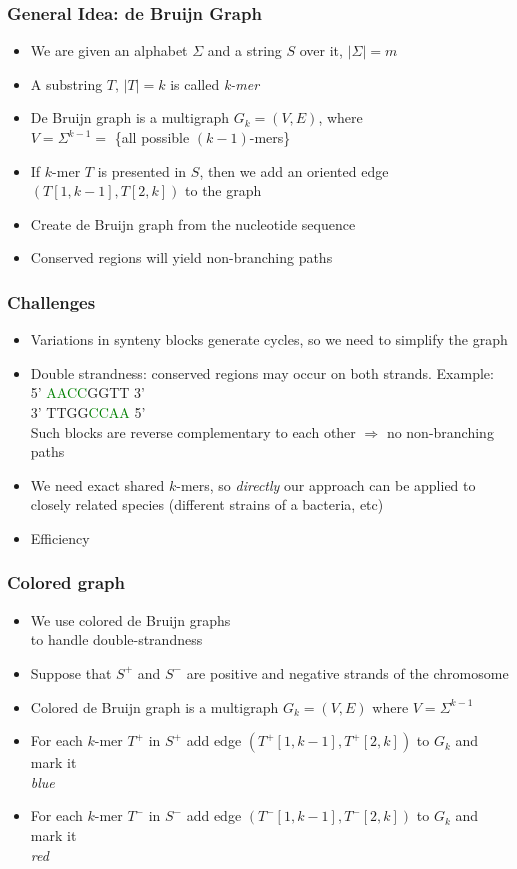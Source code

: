 \documentclass[svgnames,14pt]{beamer}
\begin{document}
\begin{frame}
\frametitle{General Idea: de Bruijn Graph}
\begin{itemize}
\item We are given an alphabet \( \Sigma \) and a string \( S \) over it, \(|\Sigma| = m \)
\item A substring \( T, \, |T| = k \) is called \textit{k-mer}
\item De Bruijn graph is a multigraph \( G_{k} = (V, E) \), where \\
\( V = \Sigma^{k - 1} = \) \{all possible \( (k - 1) \)-mers\} \\
\item If \(k\)-mer \( T \) is presented in \( S \), then we add an oriented edge \( (T[1, k - 1], T[2, k]) \) to the graph
\item Create de Bruijn graph from the nucleotide sequence
\item Conserved regions will yield non-branching paths
\end{itemize}
\end{frame}

\begin{frame}
\frametitle{Challenges}
\begin{itemize}
\item Variations in synteny blocks generate cycles, so we need to simplify the graph
\item Double strandness: conserved regions may occur on both strands. Example: \\
5' \textcolor{Green}{AACC}GGTT 3' \\
3' TTGG\textcolor{Green}{CCAA} 5' \\
Such blocks are reverse complementary to each other \( \Rightarrow \) no non-branching paths
\item We need exact shared \(k\)-mers, so \textit{directly} our approach can be applied
to closely related species (different strains of a bacteria, etc)
\item Efficiency
\end{itemize}
\end{frame}

\begin{frame}
\frametitle{Colored graph}
\begin{itemize}
\item We use colored de Bruijn graphs \\
 to handle double-strandness
\item Suppose that \( S^{+} \) and \( S^{-} \) are positive and negative strands of the chromosome
\item Colored de Bruijn graph  is a multigraph \( G_{k} = (V, E) \) where \( V =  \Sigma^{k - 1} \)
\item For each \(k\)-mer \(T^{+}\) in \(S^{+}\) add edge \( (T^{+}[1, k - 1], T^{+}[2, k]) \) to \( G_{k} \) and mark it \\ \textit{blue}
\item For each \(k\)-mer \(T^{-}\) in \(S^{-}\) add edge \( (T^{-}[1, k - 1], T^{-}[2, k]) \) to \( G_{k} \) and mark it \\ \textit{red}
\end{itemize}
\end{frame}
\end{document}
